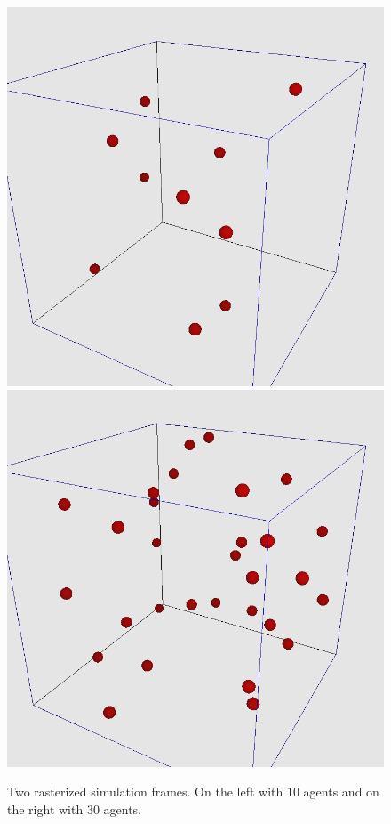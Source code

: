 \begin{figure}[htb]
\centering
	\includegraphics[width=0.45\linewidth]{../images/10-agents-render.png}
	\includegraphics[width=0.45\linewidth]{../images/30-agents-render.png}	

	\caption{\label{figure:game-renders} Two rasterized simulation frames. On the left with $10$ agents and on the right with $30$ agents.}
\end{figure}